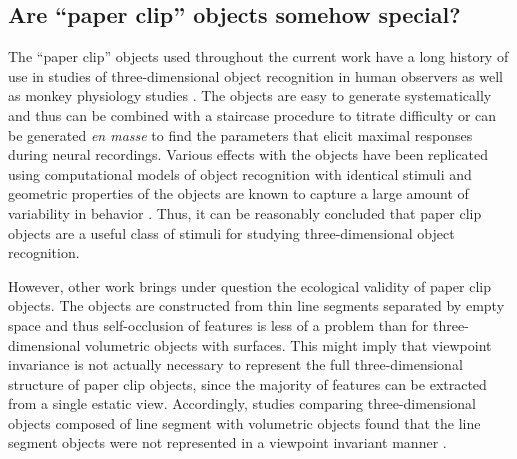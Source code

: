 \documentclass[dwyatte_dissertation.tex]{subfiles}
\begin{document}
\subsection{Are ``paper clip'' objects somehow special?}
The ``paper clip'' objects used throughout the current work have a long history of use in studies of three-dimensional object recognition in human observers \cite{BulthoffEdelman92,EdelmanBulthoff92,SinhaPoggio96} as well as monkey physiology studies \cite{LogothetisPaulsBulthoffEtAl94,LogothetisPaulsPoggio95}. The objects are easy to generate systematically and thus can be combined with a staircase procedure to titrate difficulty or can be generated \textit{en masse} to find the parameters that elicit maximal responses during neural recordings. Various effects with the objects have been replicated using computational models of object recognition with identical stimuli \cite{RiesenhuberPoggio99} and geometric properties of the objects are known to capture a large amount of variability in behavior \cite{BalasSinha09b}. Thus, it can be reasonably concluded that paper clip objects are a useful class of stimuli for studying three-dimensional object recognition.

However, other work brings under question the ecological validity of paper clip objects. The objects are constructed from thin line segments separated by empty space and thus self-occlusion of features is less of a problem than for three-dimensional volumetric objects with surfaces. This might imply that viewpoint invariance is not actually necessary to represent the full three-dimensional structure of paper clip objects, since the majority of features can be extracted from a single estatic view. Accordingly, studies comparing three-dimensional objects composed of line segment with volumetric objects found that the line segment objects were not represented in a viewpoint invariant manner \cite{FarahRochlinKlen94,PizloStevenson99}.
\end{document}
